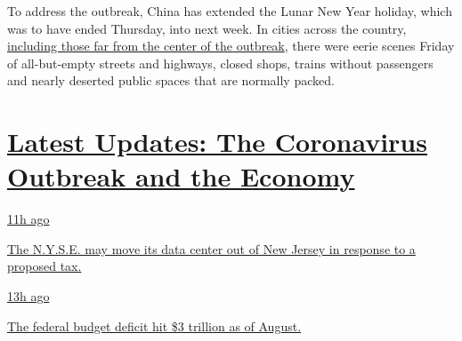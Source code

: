To address the outbreak, China has extended the Lunar New Year holiday,
which was to have ended Thursday, into next week. In cities across the
country,
\href{https://www.nytimes3xbfgragh.onion/2020/01/25/world/asia/china-wuhan-coronavirus.html?searchResultPosition=2}{including
those far from the center of the outbreak}, there were eerie scenes
Friday of all-but-empty streets and highways, closed shops, trains
without passengers and nearly deserted public spaces that are normally
packed.

\hypertarget{latest-updates-the-coronavirus-outbreak-and-the-economy}{%
\section{\texorpdfstring{\href{https://www.nytimes3xbfgragh.onion/live/2020/09/11/business/stock-market-today-coronavirus?action=click\&pgtype=Article\&state=default\&region=MAIN_CONTENT_1\&context=storylines_live_updates}{Latest
Updates: The Coronavirus Outbreak and the
Economy}}{Latest Updates: The Coronavirus Outbreak and the Economy}}\label{latest-updates-the-coronavirus-outbreak-and-the-economy}}

\href{https://www.nytimes3xbfgragh.onion/live/2020/09/11/business/stock-market-today-coronavirus?action=click\&pgtype=Article\&state=default\&region=MAIN_CONTENT_1\&context=storylines_live_updates\#the-nyse-may-move-its-data-center-out-of-new-jersey-in-response-to-a-proposed-tax}{11h
ago}

\href{https://www.nytimes3xbfgragh.onion/live/2020/09/11/business/stock-market-today-coronavirus?action=click\&pgtype=Article\&state=default\&region=MAIN_CONTENT_1\&context=storylines_live_updates\#the-nyse-may-move-its-data-center-out-of-new-jersey-in-response-to-a-proposed-tax}{The
N.Y.S.E. may move its data center out of New Jersey in response to a
proposed tax.}

\href{https://www.nytimes3xbfgragh.onion/live/2020/09/11/business/stock-market-today-coronavirus?action=click\&pgtype=Article\&state=default\&region=MAIN_CONTENT_1\&context=storylines_live_updates\#the-federal-budget-deficit-hit-3-trillion-as-of-august}{13h
ago}

\href{https://www.nytimes3xbfgragh.onion/live/2020/09/11/business/stock-market-today-coronavirus?action=click\&pgtype=Article\&state=default\&region=MAIN_CONTENT_1\&context=storylines_live_updates\#the-federal-budget-deficit-hit-3-trillion-as-of-august}{The
federal budget deficit hit \$3 trillion as of August.}

